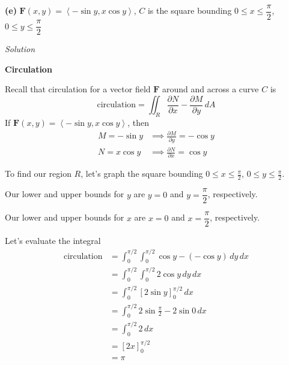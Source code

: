 \documentclass{article}
\newcommand{\lrp}[1]{\left( #1 \right)}
\newcommand{\lra}[1]{\left\langle #1 \right\rangle}
\newcommand{\lrb}[1]{\left[ #1 \right]}
\newcommand{\F}[0]{\mathbf{F}}
\newcommand{\Solution}{\textit{Solution}}
\begin{document}
{}\textbf{(e)} $\F(x,y)=\lra{-\sin y,x\cos y}$, $C$ is the square bounding $0\leq x\leq \dfrac{\pi}{2}$, $0\leq y\leq \dfrac{\pi}{2}$

\Solution

{}\textbf{Circulation}

Recall that circulation for a vector field $\F$ around and across a curve $C$ is
\begin{equation*}
    \text{circulation}= \iint_R \frac{\partial N}{\partial x} - \frac{\partial M}{\partial y}\,dA
\end{equation*}
If $\F(x,y)=\lra{-\sin y,x\cos y}$, then
\begin{align*}
    M=-\sin y&\implies \frac{\partial M}{\partial y}=-\cos y\\
    N=x\cos y&\implies \frac{\partial N}{\partial x}=\cos y
\end{align*}

To find our region $R$, let's graph the square bounding $\displaystyle 0\leq x\leq \frac{\pi}{2}$, $\displaystyle 0\leq y\leq \frac{\pi}{2}$.
\begin{center}
\end{center}
Our lower and upper bounds for $y$ are $y=0$ and $y=\dfrac{\pi}{2}$, respectively.

Our lower and upper bounds for $x$ are $x=0$ and $x=\dfrac{\pi}{2}$, respectively.

Let's evaluate the integral
\begin{align*}
    \text{circulation}&=\int_0^{\pi/2}\int_0^{\pi/2} \cos y -\lrp{-\cos y}\,dy\,dx\\
    &=\int_0^{\pi/2}\int_0^{\pi/2} 2\cos y\,dy\,dx\\
    &=\int_0^{\pi/2}\lrb{2\sin y}_0^{\pi/2}\,dx\\
    &=\int_0^{\pi/2}2\sin \frac{\pi}{2}-2\sin 0\,dx\\
    &=\int_0^{\pi/2}2\,dx\\
    &=\lrb{2x}_0^{\pi/2}\\
        &=\boxed{\pi}
\end{align*}
\end{document}

